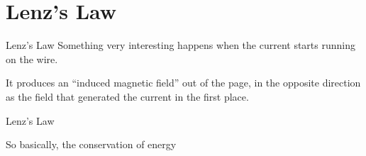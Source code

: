 \documentclass[12pt,aspectratio=169]{beamer}
\begin{document}
\section{Lenz's Law}

\begin{frame}{Lenz's Law}
  Something very interesting happens when the current starts running on the
  wire.
  \begin{center}
  \end{center}
  It produces an ``induced magnetic field'' out of the page, in the opposite
  direction as the field that generated the current in the first place.
\end{frame}



\begin{frame}{Lenz's Law}
  \begin{center}
  \end{center}

  \vspace{.2in}So basically, the conservation of energy
\end{frame}
\end{document}
